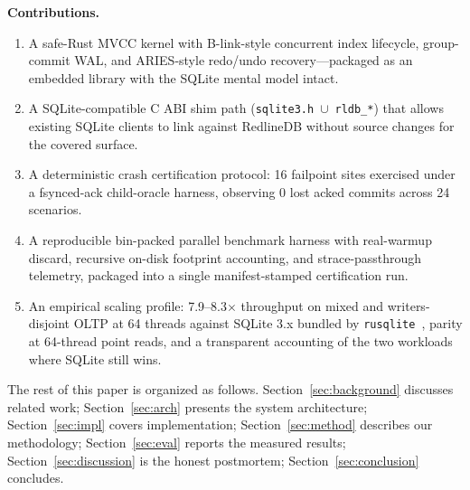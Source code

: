 \textbf{Contributions.}
\begin{enumerate}
\item A safe-Rust MVCC kernel with B-link-style concurrent index
lifecycle, group-commit WAL, and ARIES-style redo/undo
recovery---packaged as an embedded library with the SQLite mental model
intact.
\item A SQLite-compatible C ABI shim path
(\texttt{sqlite3.h}~$\cup$~\texttt{rldb\_*}) that allows existing
SQLite clients to link against RedlineDB without source changes for the
covered surface.
\item A deterministic crash certification protocol: 16 failpoint sites
exercised under a fsynced-ack child-oracle harness, observing 0 lost
acked commits across 24 scenarios.
\item A reproducible bin-packed parallel benchmark harness with
real-warmup discard, recursive on-disk footprint accounting, and
strace-passthrough telemetry, packaged into a single
manifest-stamped certification run.
\item An empirical scaling profile: 7.9--8.3$\times$ throughput on
mixed and writers-disjoint OLTP at 64 threads against SQLite 3.x
bundled by \texttt{rusqlite}~\cite{rusqlite}, parity at 64-thread point
reads, and a transparent accounting of the two workloads where SQLite
still wins.
\end{enumerate}

The rest of this paper is organized as follows. Section~\ref{sec:background}
discusses related work; Section~\ref{sec:arch} presents the system
architecture; Section~\ref{sec:impl} covers implementation;
Section~\ref{sec:method} describes our methodology;
Section~\ref{sec:eval} reports the measured results;
Section~\ref{sec:discussion} is the honest postmortem;
Section~\ref{sec:conclusion} concludes.
